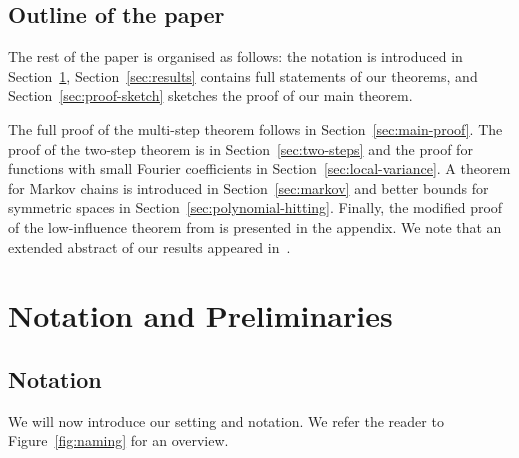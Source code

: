 \documentclass{daj}
\newcommand{\1}{\mathbbm{1}}
\theoremstyle{plain}
\theoremstyle{definition}
\begin{document}
\subsection{Outline of the paper}

The rest of the paper is organised as follows: the notation is introduced
in Section~\ref{sec:notation}, Section~\ref{sec:results} contains full
statements of our theorems, and Section~\ref{sec:proof-sketch} sketches
the proof of our main theorem.

The full proof of the multi-step theorem follows in 
Section~\ref{sec:main-proof}. The proof of the two-step theorem is in 
Section~\ref{sec:two-steps} and the proof for functions with
small Fourier coefficients in Section~\ref{sec:local-variance}.
A theorem for Markov chains is introduced in Section~\ref{sec:markov}
and better bounds for symmetric spaces in Section~\ref{sec:polynomial-hitting}.
Finally, the modified proof of the low-influence theorem from
\cite{Mos10} is presented in the appendix.
We note that an extended abstract of our results appeared 
in~\cite{HaHoMo:16}. 

\section{Notation and Preliminaries}
\label{sec:notation}

\subsection{Notation}

We will now introduce our setting and notation.
We refer the reader to Figure~\ref{fig:naming} for an overview.
\end{document}
